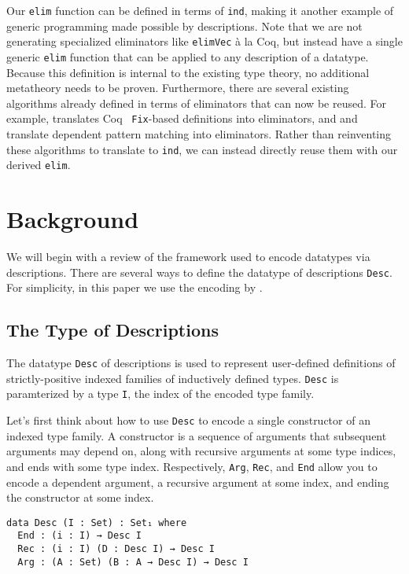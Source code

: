 \documentclass[preprint,nonatbib]{sigplanconf}
\begin{document}
Our {\tt elim} function can be defined in terms of
{\tt ind}, making it another example of generic programming made
possible by descriptions.
Note that we are not generating specialized eliminators like
{\tt elimVec} à la {\sc Coq}, but instead have a single generic
{\tt elim} function that can be applied to any description of a
datatype.
Because this definition is internal to the
existing type theory, no additional metatheory needs to be proven.
Furthermore, there are several existing algorithms already defined in
terms of eliminators that can now be reused.
For example, \citet{gimenez1995codifying} translates
{\sc Coq}~\citeyearpar{coq08} {\tt Fix}-based definitions into eliminators,
and \citet{Goguen06eliminatingdependent} and
\citet{McBride:2000:EM:646540.759262}
translate dependent pattern matching into
eliminators. Rather than reinventing these algorithms to translate to
{\tt ind}, we can instead directly reuse them with our derived {\tt elim}.

\section{Background}
\label{sec:background}

We will begin with a review of the framework used to encode datatypes
via descriptions. There are
several ways to define the datatype of descriptions {\tt Desc}. 
For simplicity, in this paper we use the encoding by
\citet{mcbride2010ornamental}.

\subsection{The Type of Descriptions}

The datatype {\tt Desc} of descriptions is used to represent
user-defined definitions of strictly-positive indexed
families of inductively defined types.
{\tt Desc} is paramterized by 
a type {\tt I}, the index of the encoded type family.

Let's first think about how to use {\tt Desc} to encode a single
constructor of an indexed type family.
A constructor is a sequence of
arguments that subsequent arguments may depend on, along with
recursive arguments at some type indices, and ends with some type index.
Respectively, {\tt Arg}, {\tt Rec}, and {\tt End} allow you to encode
a dependent argument, a recursive argument at some index, and ending the
constructor at some index.

\begin{verbatim}
data Desc (I : Set) : Set₁ where
  End : (i : I) → Desc I
  Rec : (i : I) (D : Desc I) → Desc I
  Arg : (A : Set) (B : A → Desc I) → Desc I
\end{verbatim}
\end{document}
